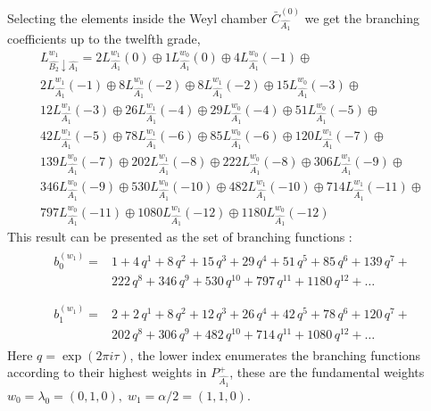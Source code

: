 \documentclass[a4paper,12pt]{article}
\theoremstyle{definition} \newtheorem{Def}{Definition}
\begin{document}
Selecting the elements inside the  Weyl chamber
$\bar{C}^{\left( 0 \right)}_{\hat{A_1}}$
we get the branching coefficients up to the twelfth grade,
\begin{multline}
  \label{eq:28}
  L^{w_1}_{\hat{B_2}\downarrow \hat{A_1}}=2 L_{\hat{A_1}}^{w_1}(0)\oplus 1 L_{\hat{A_1}}^{w_0}(0)\oplus 4 L_{\hat{A_1}}^{w_0}(-1)\oplus\\
    2 L_{\hat{A_1}}^{w_1}(-1)\oplus 8 L_{\hat{A_1}}^{w_0}(-2)\oplus
    8 L_{\hat{A_1}}^{w_1}(-2)\oplus 15 L_{\hat{A_1}}^{w_0}(-3)\oplus\\
    12 L_{\hat{A_1}}^{w_1}(-3)\oplus 26 L_{\hat{A_1}}^{w_1}(-4)\oplus
    29 L_{\hat{A_1}}^{w_0}(-4)\oplus 51 L_{\hat{A_1}}^{w_0}(-5)\oplus\\
    42 L_{\hat{A_1}}^{w_1}(-5)\oplus 78 L_{\hat{A_1}}^{w_1}(-6)\oplus
    85 L_{\hat{A_1}}^{w_0}(-6)\oplus 120 L_{\hat{A_1}}^{w_1}(-7)\oplus\\
    139 L_{\hat{A_1}}^{w_0}(-7)\oplus 202 L_{\hat{A_1}}^{w_1}(-8)\oplus
    222 L_{\hat{A_1}}^{w_0}(-8)\oplus 306 L_{\hat{A_1}}^{w_1}(-9)\oplus\\
    346 L_{\hat{A_1}}^{w_0}(-9)\oplus 530 L_{\hat{A_1}}^{w_0}(-10)\oplus
    482 L_{\hat{A_1}}^{w_1}(-10)\oplus 714 L_{\hat{A_1}}^{w_1}(-11)\oplus\\
    797 L_{\hat{A_1}}^{w_0}(-11)\oplus 1080 L_{\hat{A_1}}^{w_1}(-12)\oplus
    1180 L_{\hat{A_1}}^{w_0}(-12)
\end{multline}
This result can be presented as the set of branching functions \cite{kac1990idl}:
\begin{eqnarray}
  \label{eq:29}
  \begin{array}{cc}
    b^{(w_1)}_{0}= & 1 + 4\,q^{1}+ 8\,q^{2}+ 15\,q^{3}+ 29\,q^{4}+ 51\,q^{5}+ 85\,q^{6}+ 139\,q^{7}+\\
     &222\,q^{8}+ 346\,q^{9}+ 530\,q^{10}+ 797\,q^{11}+ 1180\,q^{12}+\dots\\
  \end{array}\\
  \begin{array}{cc}
    b^{(w_1)}_{1}= &2+2\,q^{1}+8\,q^{2}+12\,q^{3}+26\,q^{4}+42\,q^{5}+78\,q^{6}+120\,q^{7}+\\
    & 202\,q^{8}+306\,q^{9}+482\,q^{10}+714\,q^{11}+1080\,q^{12}+\dots
  \end{array}
\end{eqnarray}
Here $q=\exp (2\pi i \tau)$, the lower index enumerates the branching functions according
to their highest weights in $P^+_{\hat{A_1}}$,
these are the fundamental weights $w_0=\lambda_0=(0,1,0),\; w_1=\alpha/2=(1,1,0)$.
\end{document}
